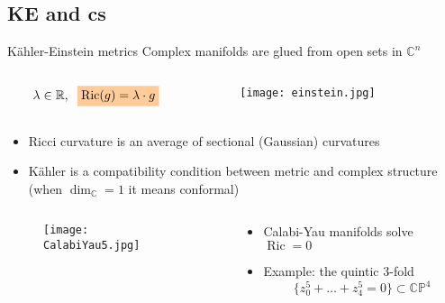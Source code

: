 \documentclass{beamer}
\newcommand{\C}{\mathbb{C}}
\newcommand{\CP}{\mathbb{CP}}
\newcommand{\R}{\mathbb{R}}
\newcommand{\mathcolorbox}[2]{\colorbox{#1}{$\displaystyle #2$}}
\DeclareMathOperator{\Ric}{Ric}
\begin{document}
\subsection{KE and cs}
\begin{frame}{K\"ahler-Einstein metrics}
Complex manifolds are glued from open sets in \(\C^n\)	
		\begin{columns}
			\begin{column}{.48\textwidth}
			\begin{equation*}
			\lambda \in \R, \hspace{2mm}
			\mathcolorbox{orange!40}{
				\Ric(g) = \lambda \cdot g
			} 
			\end{equation*}		
			\end{column}
			\begin{column}{.48\textwidth}
				\begin{figure}
					\begin{center}
						\texttt{[image: einstein.jpg]}
					\end{center}
				\end{figure}
			\end{column}
		\end{columns}
	
		\begin{itemize}
		\item Ricci curvature is an average of sectional (Gaussian) curvatures
		\item K\"ahler is a compatibility condition between metric and complex structure 
		(when \(\dim_{\C}=1\) it means conformal)
	\end{itemize}
\begin{columns}
	\begin{column}{.3\textwidth}
		\begin{figure}
			\begin{center}
				\texttt{[image: CalabiYau5.jpg]}
			\end{center}
		\end{figure}
	\end{column}
	\begin{column}{.6\textwidth}
		\begin{itemize}
			\item Calabi-Yau  manifolds solve \(\Ric=0\)
			\item Example: the  quintic 3-fold 
			\[\{z_0^5+\ldots+z_4^5=0\} \subset \CP^4\]
		\end{itemize}
	\end{column}
\end{columns}
\end{frame}
\end{document}
